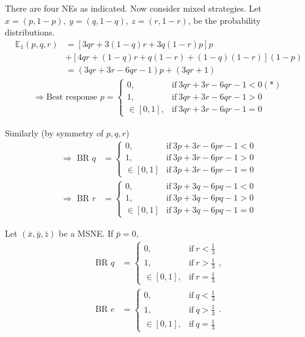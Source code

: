 There are four NEs as indicated. Now consider mixed strategies. Let $x = (p, 1-p), \ y=(q, 1-q),\ z = (r, 1-r)$, be the probability distributions.
\begin{align*}
    \mathbb{E}_1(p, q, r) &= \left[3qr + 3(1-q)r + 3q(1-r)p\right]p \\
    & + \left[4qr+(1-q)r+q(1-r)+(1-q)(1-r)\right](1-p) \\
    &= (3qr+3r-6qr-1)p + (3qr+1) 
\end{align*}
\begin{align*}
    \Longrightarrow \text{Best response }p = \left\lbrace\begin{array}{ll}
        0, & \text{if} \ 3qr+3r-6qr-1<0 (*) \\
        1, & \text{if} \ 3qr+3r-6qr-1>0 \\
        \in[0, 1], & \text{if} \ 3qr+3r-6qr-1=0
    \end{array}\right.
\end{align*}

Similarly (by symmetry of $p, q, r$)
\begin{align*}
    \Longrightarrow \text{ BR }q & = \left\lbrace\begin{array}{ll}
        0, & \text{if} \  3p+3r-6pr-1 < 0 \\
        1, & \text{if} \  3p+3r-6pr-1 > 0  \\
        \in[0, 1] & \text{if} \ 3p+3r-6pr-1 = 0 
    \end{array} \right. \\
    \Longrightarrow \text{ BR }r & = \left\lbrace\begin{array}{ll}
        0, & \text{if} \  3p+3q-6pq-1 < 0 \\
        1, & \text{if} \  3p+3q-6pq-1 > 0  \\
        \in[0, 1] & \text{if} \ 3p+3q-6pq-1 = 0 
    \end{array} \right.
\end{align*}

Let $(\bar{x}, \bar{y}, \bar{z})$ be a MSNE. If $\bar{p} = 0$, 
\begin{align*}
    \text{BR }q &= \left\lbrace\begin{array}{ll}
        0, &\text{if} \ r<\frac{1}{3}  \\
        1, &\text{if} \ r>\frac{1}{3} \\
        \in[0, 1], & \text{if}\ r= \frac{1}{3}
    \end{array} \right. ,\\
    \text{BR }e &= \left\lbrace\begin{array}{ll}
        0, &\text{if} \ q<\frac{1}{3}  \\
        1, &\text{if} \ q>\frac{1}{3} \\
        \in[0, 1], & \text{if}\ q= \frac{1}{3}
    \end{array} \right. .
\end{align*}

